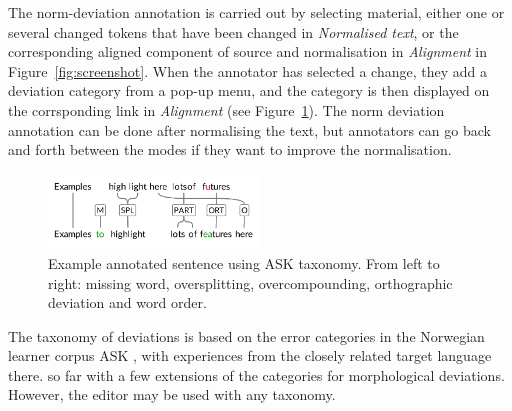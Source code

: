 \documentclass[10pt, a4paper]{article}
\newcommand{\mats}[1]{{\color{Blue}{Mats: #1}}}
\begin{document}
The norm-deviation annotation is carried out by selecting material, either
one or several changed tokens that have been changed in {\em Normalised text},
or the corresponding aligned component of source and normalisation
in {\em Alignment} in Figure~\ref{fig:screenshot}.
When the annotator has selected a change, they add a deviation
category from a pop-up menu, and the category is then displayed on the
corrsponding link in {\em Alignment} (see Figure~\ref{fig:normann}).
The norm deviation annotation can be done after normalising the text, but
annotators can go back and forth between the modes if they want to improve
the normalisation.


\begin{figure}[t] %
\includegraphics[height=2.0cm, trim={-0.5cm 0.55cm 0 0}, clip]{features7.pdf}
\caption{Example annotated sentence using ASK taxonomy. From left to right:
missing word, oversplitting, overcompounding, orthographic deviation and
word order.
\label{fig:normann}}
\end{figure}

The taxonomy of deviations is based on the error categories in the Norwegian
learner corpus ASK \cite{tenfjord2006ask}, with %
experiences from the closely related target language there.  so far with a
few extensions of the categories for morphological deviations.
However, the editor may be used with any taxonomy.


\end{document}
